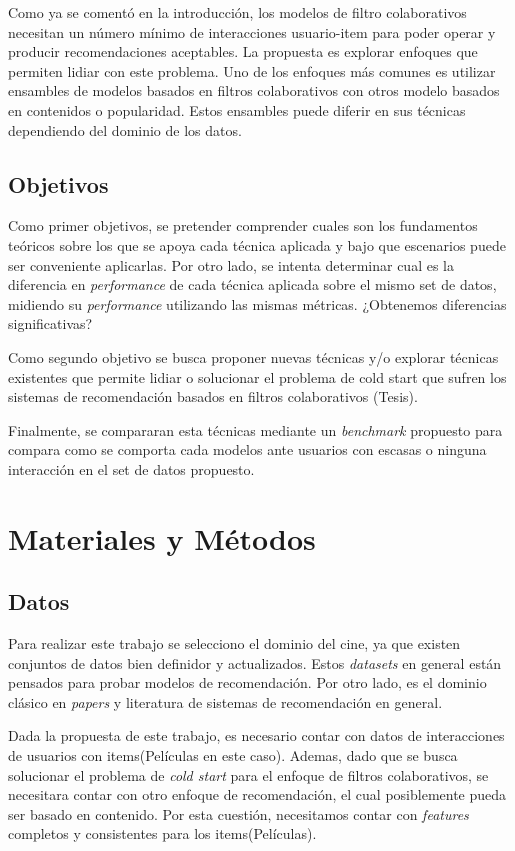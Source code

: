 \documentclass[11pt,a4paper,twoside]{thesis}
\begin{document}
Como ya se comentó en la introducción, los modelos de filtro colaborativos
necesitan un número mínimo de interacciones usuario-item para poder operar y
producir recomendaciones aceptables. La propuesta es explorar enfoques que
permiten lidiar con este problema. Uno de los enfoques más comunes es utilizar
ensambles de modelos basados en filtros colaborativos con otros modelo basados
en contenidos o popularidad. Estos ensambles puede diferir en sus técnicas
dependiendo del dominio de los datos.

\section{Objetivos}

Como primer objetivos, se pretender comprender cuales son los fundamentos
teóricos sobre los que se apoya cada técnica aplicada y bajo que escenarios
puede ser conveniente aplicarlas. Por otro lado, se intenta determinar cual es
la diferencia en \textit{performance} de cada técnica aplicada sobre el mismo
set de datos, midiendo su \textit{performance} utilizando las mismas métricas.
¿Obtenemos diferencias significativas?

Como segundo objetivo se busca proponer nuevas técnicas y/o explorar técnicas
existentes que permite lidiar o solucionar el problema de cold start que sufren
los sistemas de recomendación basados en filtros colaborativos (Tesis).

Finalmente, se compararan esta técnicas mediante un \textit{benchmark}
propuesto para compara como se comporta cada modelos ante usuarios con escasas
o ninguna interacción en el set de datos propuesto.

\chapter{Materiales y Métodos}

\section{Datos}

Para realizar este trabajo se selecciono el dominio del cine, ya que existen
conjuntos de datos bien definidor y actualizados. Estos \textit{datasets} en
general están pensados para probar modelos de recomendación. Por otro lado, es
el dominio clásico en \textit{papers} y literatura de sistemas de recomendación
en general.

Dada la propuesta de este trabajo, es necesario contar con datos de
interacciones de usuarios con items(Películas en este caso). Ademas, dado que
se busca solucionar el problema de \textit{cold start} para el enfoque de
filtros colaborativos, se necesitara contar con otro enfoque de recomendación,
el cual posiblemente pueda ser basado en contenido. Por esta cuestión,
necesitamos contar con \textit{features} completos y consistentes para los
items(Películas).
\end{document}
